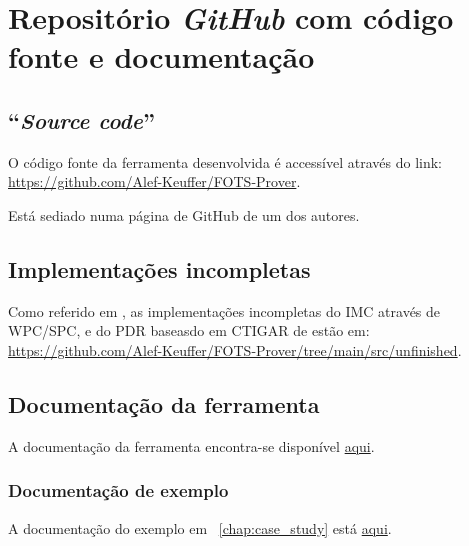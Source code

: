 \documentclass[11pt,a4paper]{report}%
\begin{document}
\chapter{Repositório \textit{GitHub} com código fonte e documentação} \label{apndx:github}

\section*{``\textit{Source code}''}

O código fonte da ferramenta desenvolvida é accessível através do link: \url{https://github.com/Alef-Keuffer/FOTS-Prover}.

Está sediado numa página de GitHub de um dos autores.

\section*{Implementações incompletas}

Como referido em  \label{analysis:pdr, imc_wpc_spc}, as implementações incompletas do IMC
através de WPC/SPC, e do PDR baseasdo em CTIGAR de \cite{ctigar} estão em: \url{https://github.com/Alef-Keuffer/FOTS-Prover/tree/main/src/unfinished}.

\section*{Documentação da ferramenta}

A documentação da ferramenta encontra-se disponível \href{https://alef-keuffer.github.io/FOTS-Prover.docs/index.html}{aqui}.

\subsection*{Documentação de exemplo}
\label{apndx:example}

A documentação do exemplo em ~\ref{chap:case_study} está 
\href{https://alef-keuffer.github.io/FOTS-Prover.docs/examples.trab4.html}{aqui}.

\newpage



\end{document}
